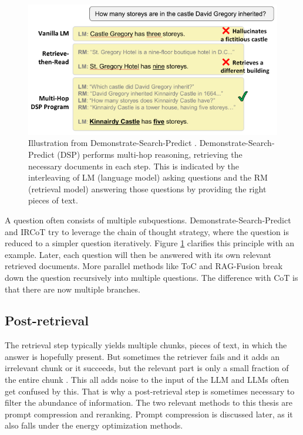 \begin{figure}[h]
	\centering
	\includegraphics[width=0.7\linewidth]{fig/demonstrate_search_predict.png}
	\caption{Illustration from Demonstrate-Search-Predict \cite{khattab2022demonstrate}. Demonstrate-Search-Predict (DSP) performs multi-hop reasoning, retrieving the necessary documents in each step. This is indicated by the interleaving of LM (language model) asking questions and the RM (retrieval model) answering those questions by providing the right pieces of text.}
	\label{fig:demonstrate_search_predict}
\end{figure}

A question often consists of multiple subquestions. Demonstrate-Search-Predict \cite{khattab2022demonstrate} and IRCoT \cite{trivedi2022interleaving} try to leverage the chain of thought strategy, where the question is reduced to a simpler question iteratively. Figure \ref{fig:demonstrate_search_predict} clarifies this principle with an example. Later, each question will then be answered with its own relevant retrieved documents. More parallel methods like ToC \cite{kim2023tree} and RAG-Fusion \cite{rackauckas2024ragfusion} break down the question recursively into multiple questions. The difference with CoT is that there are now multiple branches.

\subsection{Post-retrieval}
The retrieval step typically yields multiple chunks, pieces of text, in which the answer is hopefully present. But sometimes the retriever fails and it adds an irrelevant chunk or it succeeds, but the relevant part is only a small fraction of the entire chunk \cite{fan2024survey}. This all adds noise to the input of the LLM and LLMs often get confused by this. That is why a post-retrieval step is sometimes necessary to filter the abundance of information. The two relevant methods to this thesis are prompt compression and reranking. Prompt compression is discussed later, as it also falls under the energy optimization methods.

